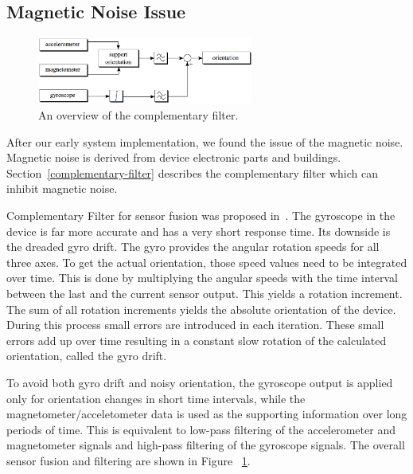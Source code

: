 \subsection{Magnetic Noise Issue}
\begin{figure}
  \vspace{-40pt}
  \begin{center}
    \includegraphics[width=2.8in]{fig/fig-complementary-filter.eps}
  \end{center}
  \vspace{-20pt}
  \caption{An overview of the complementary filter.}\label{fig-complementary-filter}
  \vspace{-20pt}
\end{figure}
After our early system implementation, we found the issue of the magnetic noise. Magnetic noise is derived from device electronic parts and buildings. Section~\ref{complementary-filter} describes the complementary filter which can inhibit magnetic noise.

Complementary Filter for sensor fusion was proposed in~\cite{colton2007balance}. The gyroscope in the device is far more accurate and has a very short response time. Its downside is the dreaded gyro drift. The gyro provides the angular rotation speeds for all three axes. To get the actual orientation, those speed values need to be integrated over time.  This is done by multiplying the angular speeds with the time interval between the last and the current sensor output. This yields a rotation increment. The sum of all rotation increments yields the absolute orientation of the device. During this process small errors are introduced in each iteration. These small errors add up over time resulting in a constant slow rotation of the calculated orientation, called the gyro drift.

To avoid both gyro drift and noisy orientation, the gyroscope output is applied only for orientation changes in short time intervals, while the magnetometer/acceletometer data is used as the supporting information over long periods of time. This is equivalent to low-pass filtering of the accelerometer and magnetometer signals and high-pass filtering of the gyroscope signals. The overall sensor fusion and filtering are shown in Figure ~\ref{fig-complementary-filter}.

